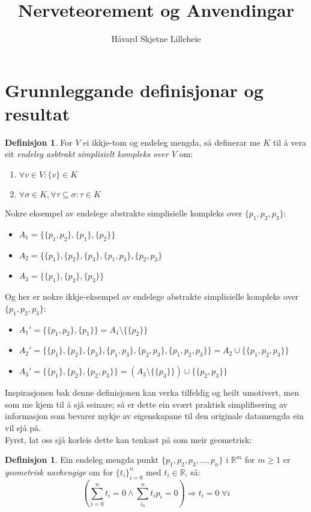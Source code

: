 \documentclass[a4paper, titlepage, 12pt, norsk]{article}
\title{Nerveteorement og Anvendingar}
\author{Håvard Skjetne Lilleheie}
\theoremstyle{plain}
\theoremstyle{definition}
\newtheorem{definition}[theorem]{Definisjon}
\newcommand{\R}{\mathbb{R}}
\begin{document}
\maketitle

\section{Grunnleggande definisjonar og resultat}

\begin{definition}
	For $V$ ei ikkje-tom og endeleg mengda, så definerar me $K$ til å vera eit \emph{endeleg asbtrakt simplisielt kompleks over $V$} om:
	\begin{enumerate}
		\item{$\forall v \in V: \{v\} \in K$}
		\item{$\forall \sigma \in K, \forall \tau \subseteq \sigma: \tau \in K$}
	\end{enumerate}
\end{definition}
Nokre eksempel av endelege abstrakte simplisielle kompleks over $\{p_1, p_2, p_3\}$:
\begin{itemize}
	\item{$A_1=\{\{p_1, p_2\}, \{p_1\}, \{p_2\}\}$}
	\item{$A_2=\{\{p_1\}, \{p_2\}, \{p_3\}, \{p_1, p_3\}, \{p_2, p_3\}$}
	\item{$A_3=\{\{p_1\}, \{p_2\}, \{p_3\}\}$}
\end{itemize}
Og her er nokre ikkje-eksempel av endelege abstrakte simplisielle kompleks over $\{p_1, p_2, p_3\}$:
\begin{itemize}
	\item{$A_1'=\{\{p_1, p_2\}, \{p_1\}\}=A_1 \setminus \{\{p_2\}\}$}
	\item{$A_2'=\{\{p_1\}, \{p_2\}, \{p_3\}, \{p_1, p_3\}, \{p_2, p_3\}, \{p_1, p_2, p_3\}\}=A_2 \cup \{\{p_1, p_2, p_3\}\}$}
	\item{$A_3'=\{\{p_1\}, \{p_2\}, \{p_2, p_3\}\}=\left(A_3 \setminus \{\{p_3\}\}\right) \cup \{\{p_2, p_3\}\}$}
\end{itemize}
Inspirasjonen bak denne definisjonen kan verka tilfeldig og heilt umotivert, men som me kjem til å sjå seinare; så er dette ein svært praktisk simplifisering av informasjon som bevarer mykje av eigenskapane til den originale datamengda ein vil sjå på. 
\\Fyrst, lat oss sjå korleis dette kan tenkast på som meir geometrisk:
\begin{definition}
	Ein endeleg mengda punkt $\{p_1, p_2, p_3, \dots, p_n\}$ i $\R^m$ for $m\geq1$ er \emph{geometrisk uavhengige} om for $\{t_i\}_{i=0}^n$ med $t_i\in\R$, så:
	\begin{equation*}
		\left(\sum_{i=0}^n t_i=0 \land  \sum_{i_0}^n t_ip_i=0\right)\Rightarrow t_i=0 \; \forall i
	\end{equation*}
\end{definition}
\end{document}
